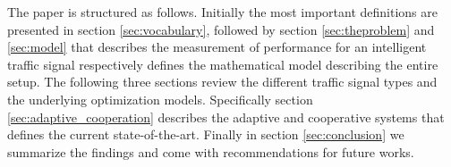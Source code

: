 The paper is structured as follows. Initially the most important
definitions are presented in section \ref{sec:vocabulary}, followed by
section \ref{sec:theproblem} and \ref{sec:model} that describes the
measurement of performance for an intelligent traffic signal
respectively defines the mathematical model describing the entire
setup. The following three sections review the different traffic
signal types and the underlying optimization models. Specifically
section \ref{sec:adaptive_cooperation} describes the adaptive and
cooperative systems that defines the current state-of-the-art. Finally
in section \ref{sec:conclusion} we summarize the findings and come
with recommendations for future works.
